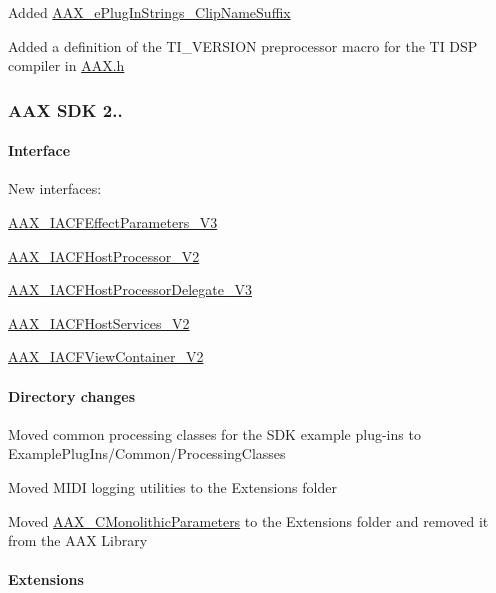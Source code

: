 \begin{DoxyItemize}
\item Added \hyperlink{a00206_a86f7310877399d9d4d2ea4863d472476ac2ad5da7b876541a94ca9471193b7195}{A\+A\+X\+\_\+e\+Plug\+In\+Strings\+\_\+\+Clip\+Name\+Suffix} 
\item Added a definition of the {\ttfamily T\+I\+\_\+\+V\+E\+R\+S\+I\+O\+N} preprocessor macro for the T\+I D\+S\+P compiler in \hyperlink{a00149}{A\+A\+X.\+h} 
\end{DoxyItemize}\hypertarget{a00375_aax_sdk_2p2p0}{}\subsubsection{A\+A\+X S\+D\+K 2..}\label{a00375_aax_sdk_2p2p0}
\hypertarget{a00375_aax_sdk_2p2p0_Interface}{}\paragraph{Interface}\label{a00375_aax_sdk_2p2p0_Interface}

\begin{DoxyItemize}
\item New interfaces\+: 
\begin{DoxyItemize}
\item \hyperlink{a00063}{A\+A\+X\+\_\+\+I\+A\+C\+F\+Effect\+Parameters\+\_\+\+V3} 
\item \hyperlink{a00067}{A\+A\+X\+\_\+\+I\+A\+C\+F\+Host\+Processor\+\_\+\+V2} 
\item \hyperlink{a00070}{A\+A\+X\+\_\+\+I\+A\+C\+F\+Host\+Processor\+Delegate\+\_\+\+V3} 
\item \hyperlink{a00072}{A\+A\+X\+\_\+\+I\+A\+C\+F\+Host\+Services\+\_\+\+V2} 
\item \hyperlink{a00085}{A\+A\+X\+\_\+\+I\+A\+C\+F\+View\+Container\+\_\+\+V2} 
\end{DoxyItemize}
\end{DoxyItemize}\hypertarget{a00375_aax_sdk_2p2p0_Directory_changes}{}\paragraph{Directory changes}\label{a00375_aax_sdk_2p2p0_Directory_changes}

\begin{DoxyItemize}
\item Moved common processing classes for the S\+D\+K example plug-\/ins to Example\+Plug\+Ins/\+Common/\+Processing\+Classes 
\item Moved M\+I\+D\+I logging utilities to the Extensions folder 
\item Moved \hyperlink{a00026}{A\+A\+X\+\_\+\+C\+Monolithic\+Parameters} to the Extensions folder and removed it from the A\+A\+X Library 
\end{DoxyItemize}\hypertarget{a00375_aax_sdk_2p0p0_Extensions}{}\paragraph{Extensions}\label{a00375_aax_sdk_2p0p0_Extensions}

